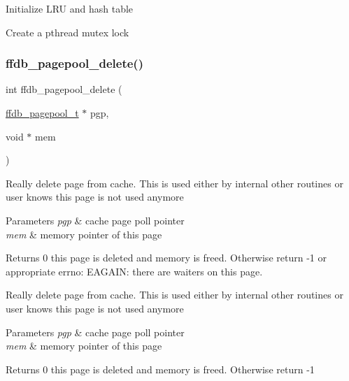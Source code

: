 Initialize L\+RU and hash table

Create a pthread mutex lock\mbox{\label{adat-devel_2other__libs_2filedb_2filehash_2ffdb__pagepool_8h_ad53e778be42420ab49a02b1d238b7533}} 
\subsubsection{\texorpdfstring{ffdb\_pagepool\_delete()}{ffdb\_pagepool\_delete()}}
{\footnotesize\ttfamily int ffdb\+\_\+pagepool\+\_\+delete (\begin{DoxyParamCaption}\item[{\mbox{\hyperlink{adat-devel_2other__libs_2filedb_2filehash_2ffdb__pagepool_8h_a73290f737b0e5f8be90a0fa96ddf6ab6}{ffdb\+\_\+pagepool\+\_\+t}} $\ast$}]{pgp,  }\item[{void $\ast$}]{mem }\end{DoxyParamCaption})}

Really delete page from cache. This is used either by internal other routines or user knows this page is not used anymore 
\begin{DoxyParams}{Parameters}
{\em pgp} & cache page poll pointer \\
\hline
{\em mem} & memory pointer of this page \\
\hline
\end{DoxyParams}
\begin{DoxyReturn}{Returns}
0 this page is deleted and memory is freed. Otherwise return -\/1 or appropriate errno\+: E\+A\+G\+A\+IN\+: there are waiters on this page.
\end{DoxyReturn}
Really delete page from cache. This is used either by internal other routines or user knows this page is not used anymore 
\begin{DoxyParams}{Parameters}
{\em pgp} & cache page poll pointer \\
\hline
{\em mem} & memory pointer of this page \\
\hline
\end{DoxyParams}
\begin{DoxyReturn}{Returns}
0 this page is deleted and memory is freed. Otherwise return -\/1 
\end{DoxyReturn}
\mbox{\label{adat-devel_2other__libs_2filedb_2filehash_2ffdb__pagepool_8h_aee2dbd77212ac78d15ab0511dee2d1ba}} 
